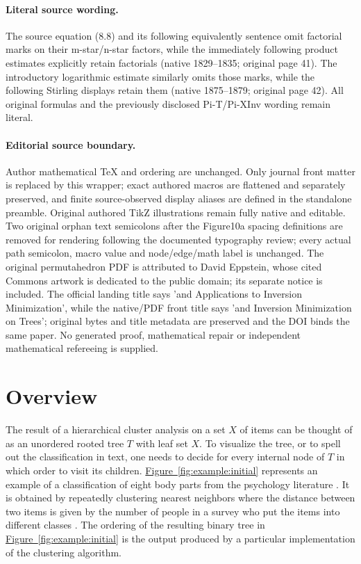 \documentclass[11pt]{article}
\numberwithin{equation}{section}
\theoremstyle{definition}
\theoremstyle{plain}
\newcommand{\expref}[2]{\hyperref[#2]{#1~\ref{#2}}}
\begin{document}
\paragraph{Literal source wording.}
The source equation (8.8) and its following equivalently sentence omit factorial marks on their m-star/n-star factors, while the immediately following product estimates explicitly retain factorials (native 1829--1835; original page 41). The introductory logarithmic estimate similarly omits those marks, while the following Stirling displays retain them (native 1875--1879; original page 42). All original formulas and the previously disclosed Pi-T/Pi-XInv wording remain literal.
\paragraph{Editorial source boundary.}
Author mathematical TeX and ordering are unchanged. Only journal front matter is replaced by this wrapper; exact authored macros are flattened and separately preserved, and finite source-observed display aliases are defined in the standalone preamble. Original authored TikZ illustrations remain fully native and editable. Two original orphan text semicolons after the Figure10a spacing definitions are removed for rendering following the documented typography review; every actual path semicolon, macro value and node/edge/math label is unchanged. The original permutahedron PDF is attributed to David Eppstein, whose cited Commons artwork is dedicated to the public domain; its separate notice is included. The official landing title says 'and Applications to Inversion Minimization', while the native/PDF front title says 'and Inversion Minimization on Trees'; original bytes and title metadata are preserved and the DOI binds the same paper. No generated proof, mathematical repair or independent mathematical refereeing is supplied. 
\clearpage

%
%
%



\section{Overview}
\label{sec:overview}

The result of a hierarchical cluster analysis on a set $X$ of items can be thought of as an unordered rooted tree $T$ with leaf set $X$. To visualize the tree, or to spell out the classification in text, one needs to decide for every internal node of $T$ in which order to visit its children. \expref{Figure}{fig:example:initial} represents an example of a classification of eight body parts from the psychology literature \cite{Degerman1982}. It is obtained by repeatedly clustering nearest neighbors where the distance between two items is given by the number of people in a survey who put the items into different classes \cite{Miller1969}. The ordering of the resulting binary tree in \expref{Figure}{fig:example:initial} is the output produced by a particular implementation of the clustering algorithm.  %
%
\end{document}
